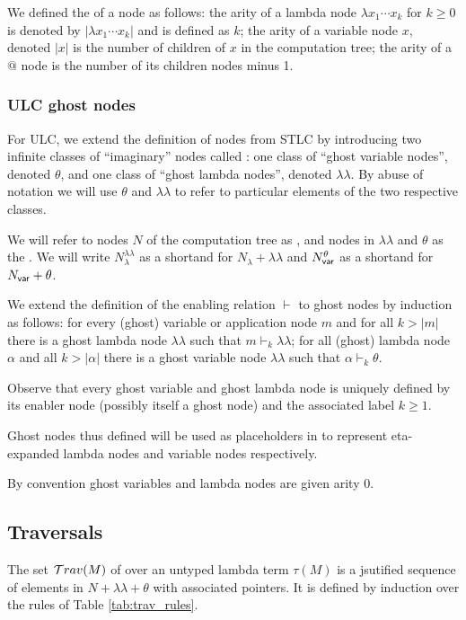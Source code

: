 \documentclass{article}
\theoremstyle{definition}
\newcommand\Nodes{N}%
\newcommand\NodesVar{N_{\sf var}}%
\newcommand\NodesLmd{N_\lambda}%
\newcommand{\ghostlmd}{{\lambda\!\!\lambda}}
\newcommand{\ghostvar}{\theta}
\newcommand{\enables}{\vdash}
\begin{document}
We defined the  of a node as follows: the arity of a lambda node $\lambda x_1 \cdots x_k$ for $k\geq 0$ is denoted by $|\lambda x_1 \cdots x_k|$ and is defined as $k$; the arity of a variable node $x$, denoted $|x|$ is the number of children of $x$ in the computation tree; the arity of a $@$ node is the number of its children nodes minus 1.

\subsubsection{ULC ghost nodes}
For ULC, we extend the definition of nodes from STLC by introducing two infinite classes of ``imaginary'' nodes called :
one class of ``ghost variable nodes'', denoted $\ghostvar$, and one class of ``ghost lambda nodes'', denoted $\ghostlmd$. By abuse of notation we will use $\ghostvar$ and $\ghostlmd$ to refer to particular elements of the two respective classes.

We will refer to nodes $\Nodes$ of the computation tree as , and nodes in $\ghostlmd$ and $\ghostvar$ as the . We will write $\NodesLmd^\ghostlmd$ as a shortand for $\NodesLmd + \ghostlmd$
and $\NodesVar^\ghostvar$ as a shortand for $\NodesVar + \ghostvar$.

We extend the definition of the enabling relation $\enables$ to ghost nodes by induction as follows: for every (ghost) variable or application node $m$ and for all $k>|m|$ there is a ghost lambda node $\ghostlmd$ such that $m \enables_k \ghostlmd$; for all (ghost) lambda node $\alpha$ and all $k>|\alpha|$ there is a ghost variable node $\ghostlmd$ such that $\alpha \enables_k \ghostvar$.

Observe that every ghost variable and ghost lambda node is uniquely defined by its enabler node (possibly itself a ghost node) and the associated label $k\geq 1$.

Ghost nodes thus defined will be used as placeholders in  to represent eta-expanded lambda nodes and variable nodes respectively.

By convention ghost variables and lambda nodes are given arity $0$.

\subsection{Traversals}

The set $\mathcal{T}rav(M)$ of  over an untyped lambda term $\tau(M)$ is a jsutified sequence of elements in $\Nodes + \ghostlmd + \ghostvar$ with associated pointers. It is defined by induction over the rules of Table \ref{tab:trav_rules}.
\end{document}
